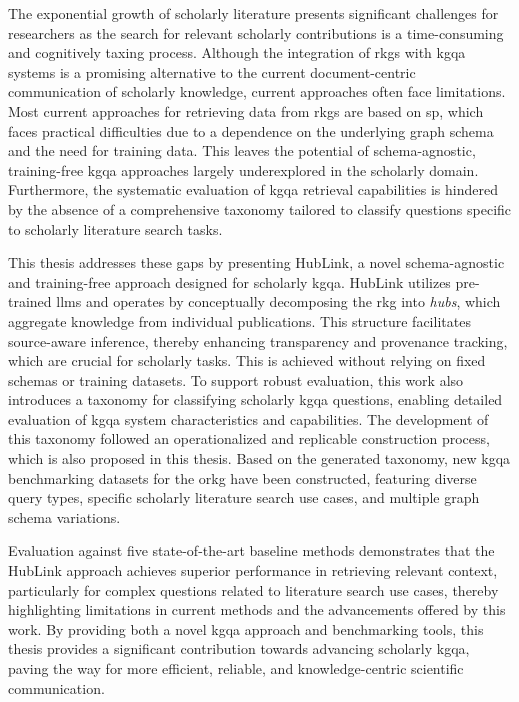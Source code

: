 
\Abstract
\glsresetall
The exponential growth of scholarly literature presents significant challenges for researchers as the search for relevant scholarly contributions is a time-consuming and cognitively taxing process. Although the integration of \glspl{rkg} with \gls{kgqa} systems is a promising alternative to the current document-centric communication of scholarly knowledge, current approaches often face limitations. Most current approaches for retrieving data from \glspl{rkg} are based on \gls{sp}, which faces practical difficulties due to a dependence on the underlying graph schema and the need for training data. This leaves the potential of schema-agnostic, training-free \gls{kgqa} approaches largely underexplored in the scholarly domain. Furthermore, the systematic evaluation of \gls{kgqa} retrieval capabilities is hindered by the absence of a comprehensive taxonomy tailored to classify questions specific to scholarly literature search tasks.

This thesis addresses these gaps by presenting HubLink, a novel schema-agnostic and training-free approach designed for scholarly \gls{kgqa}. HubLink utilizes pre-trained \glspl{llm} and operates by conceptually decomposing the \gls{rkg} into \emph{hubs}, which aggregate knowledge from individual publications. This structure facilitates source-aware inference, thereby enhancing transparency and provenance tracking, which are crucial for scholarly tasks. This is achieved without relying on fixed schemas or training datasets. To support robust evaluation, this work also introduces a taxonomy for classifying scholarly \gls{kgqa} questions, enabling detailed evaluation of \gls{kgqa} system characteristics and capabilities. The development of this taxonomy followed an operationalized and replicable construction process, which is also proposed in this thesis. Based on the generated taxonomy, new \gls{kgqa} benchmarking datasets for the \gls{orkg} have been constructed, featuring diverse query types, specific scholarly literature search use cases, and multiple graph schema variations.

Evaluation against five state-of-the-art baseline methods demonstrates that the HubLink approach achieves superior performance in retrieving relevant context, particularly for complex questions related to literature search use cases, thereby highlighting limitations in current methods and the advancements offered by this work. By providing both a novel \gls{kgqa} approach and benchmarking tools, this thesis provides a significant contribution towards advancing scholarly \gls{kgqa}, paving the way for more efficient, reliable, and knowledge-centric scientific communication.